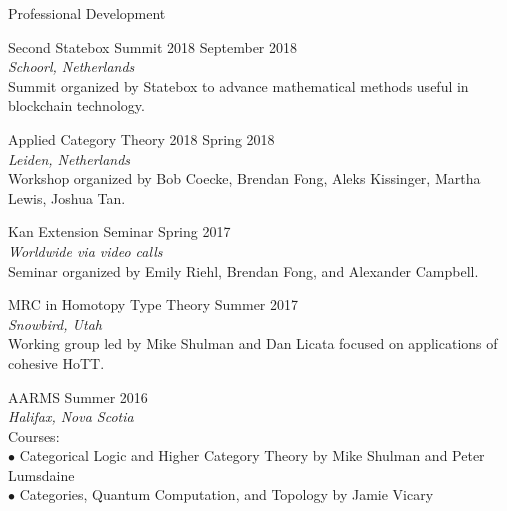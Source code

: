 \documentclass{Resume} %
\begin{document}
\begin{rSection}{Professional Development}

  {\sc Second Statebox Summit 2018} \hfill
  {September 2018} \\
  \hfill
  {\em Schoorl, Netherlands} \\
  Summit organized by Statebox to advance mathematical methods useful
  in blockchain technology.
  
  {\sc Applied Category Theory 2018} \hfill
  {Spring 2018} \\
  \hfill
  {\em Leiden, Netherlands} \\
  Workshop organized by Bob Coecke, Brendan Fong, Aleks Kissinger,
  Martha Lewis, Joshua Tan.
	
  {\sc Kan Extension Seminar} \hfill
  {Spring 2017} \\
  \hfill
  {\em Worldwide via video calls} \\
  Seminar organized by Emily Riehl, Brendan Fong, and Alexander
  Campbell.
	
  {\sc MRC in Homotopy Type Theory} \hfill
  {Summer 2017} \\
  \hfill
  {\em Snowbird, Utah} \\
  Working group led by Mike Shulman and Dan Licata focused on
  applications of cohesive HoTT.
        
  {\sc AARMS} \hfill
  {Summer 2016} \\
  \hfill
  {\em Halifax, Nova Scotia} \\
  Courses: \\
  $ \bullet $ {Categorical Logic and Higher Category Theory by
    Mike Shulman and Peter Lumsdaine} \\
  $ \bullet $ {Categories, Quantum Computation, and Topology by Jamie
    Vicary}
		
\end{rSection}



%
%
%
%
\end{document}

